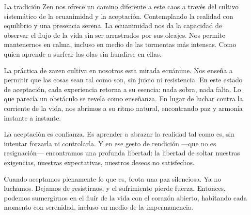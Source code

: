 \documentclass[
  a5paperpaper,
]{article}
\begin{document}
La tradición Zen nos ofrece un camino diferente a este caos a través del
cultivo sistemático de la ecuanimidad y la aceptación. Contemplando la
realidad con equilibrio y una presencia serena. La ecuanimidad nos da la
capacidad de observar el flujo de la vida sin ser arrastrados por sus
oleajes. Nos permite mantenernos en calma, incluso en medio de las
tormentas más intensas. Como quien aprende a surfear las olas sin
hundirse en ellas.

La práctica de zazen cultiva en nosotros esta mirada ecuánime. Nos
enseña a permitir que las cosas sean tal como son, sin juicio ni
resistencia. En este estado de aceptación, cada experiencia retorna a su
esencia: nada sobra, nada falta. Lo que parecía un obstáculo se revela
como enseñanza. En lugar de luchar contra la corriente de la vida, nos
abrimos a su ritmo natural, encontrando paz y armonía instante a
instante.

La aceptación es confianza. Es aprender a abrazar la realidad tal como
es, sin intentar forzarla ni controlarla. Y en ese gesto de rendición
---que no es resignación--- encontramos una profunda libertad: la
libertad de soltar nuestras exigencias, nuestras expectativas, nuestros
deseos no satisfechos.

Cuando aceptamos plenamente lo que es, brota una paz silenciosa. Ya no
luchamos. Dejamos de resistirnos, y el sufrimiento pierde fuerza.
Entonces, podemos sumergirnos en el fluir de la vida con el corazón
abierto, habitando cada momento con serenidad, incluso en medio de la
impermanencia.

\hfill\break

\hfill\break
\end{document}
